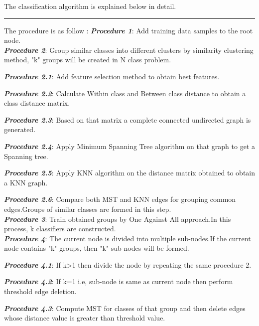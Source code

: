 \documentclass[a4paper, 10pt, conference]{ieeeconf}      %
\begin{document}
The classification algorithm is explained below in detail.
\newline \\
\vspace{0.2cm}
\hrule
\vspace{0.2cm}
The procedure is as follow :
\newline
\vspace{0.2cm}
\textit{\textbf{Procedure 1}}: Add training data samples to the root node.
\newline \\
\textit{\textbf{Procedure 2}}: Group similar classes into different clusters by similarity clustering method, "k" groups will be created in N class problem.
\par \textit{\textbf{Procedure 2.1}}: Add feature selection method to obtain best features.
\par \textit{\textbf{Procedure 2.2}}: Calculate Within class and Between class distance to obtain a class distance matrix.
\par \textit{\textbf{Procedure 2.3}}: Based on that matrix a complete connected undirected graph is generated.
\par \textit{\textbf{Procedure 2.4}}: Apply Minimum Spanning Tree algorithm on that graph to get a Spanning tree. 
\par \textit{\textbf{Procedure 2.5}}: Apply KNN algorithm on the distance matrix obtained to obtain a KNN graph.
\par\textit{\textbf{Procedure 2.6}}: Compare both MST and KNN edges for grouping common edges.Groups of similar classes are formed in this step. \\
\newline
\textit{\textbf{Procedure 3}}: Train obtained groups by One Against All approach.In this process, k classifiers are constructed.
\newline \\
\textit{\textbf{Procedure 4}}: The current node is divided into multiple sub-nodes.If the current node contains "k" groups, then "k" sub-nodes will be formed.
\par \textit{\textbf{Procedure 4.1}}: If k\textgreater1 then divide the node by repeating the same procedure 2.
\par \textit{\textbf{Procedure 4.2}}: If k=1 i.e, sub-node is same as current node then perform threshold edge deletion. 
\par \textit{\textbf{Procedure 4.3}}: Compute MST for classes of that group and then delete edges whose distance value is greater than threshold value.
\end{document}
